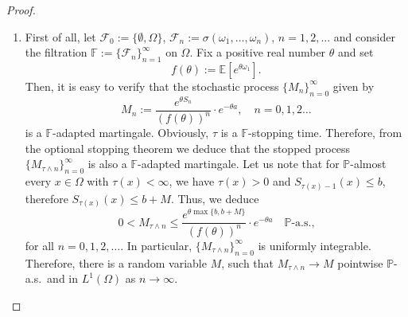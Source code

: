 \documentclass{amsart}
\newcommand{\cF}{\mathcal{F}}
\theoremstyle{definition}
\theoremstyle{remark}
\begin{document}
\begin{proof}
\begin{enumerate}
    \item First of all, let $\cF_0:=\{\emptyset,\Omega\}$, $\cF_n:=\sigma(\omega_1,\ldots,\omega_n)$, $n=1,2,\ldots$ and consider the filtration $\mathbb{F}:=\{\mathcal{F}_n\}^{\infty}_{n=1}$ on $\Omega$. Fix a positive real number $\theta$ and set
	\begin{equation*}
		f(\theta):=\mathbb{E}[e^{\theta\omega_1}].
	\end{equation*}
	Then, it is easy to verify that the stochastic process $\{M_n\}^{\infty}_{n=0}$ given by
	\begin{equation*}
		M_n:=\frac{e^{\theta S_n}}{(f(\theta))^n}\cdot e^{-\theta a},\quad n=0,1,2\ldots
	\end{equation*}
	is a $\mathbb{F}$-adapted martingale. Obviously, $\tau$ is a $\mathbb{F}$-stopping time. Therefore, from the optional stopping theorem we deduce that the stopped process $\{M_{\tau\wedge n}\}^{\infty}_{n=0}$ is also a $\mathbb{F}$-adapted martingale. Let us note that for $\mathbb{P}$-almost every $x\in\Omega$ with $\tau(x)<\infty$, we have $\tau(x)>0$ and $S_{\tau(x)-1}(x)\leq b$, therefore $S_{\tau(x)}(x)\leq b+M$. Thus, we deduce
	\begin{equation*}
		0<M_{\tau\wedge n}\leq\frac{e^{\theta\max\{b,b+M\}}}{(f(\theta))^n}\cdot e^{-\theta a}\quad\mathbb{P}\text{-a.s.,}
	\end{equation*}
    for all $n=0,1,2,\ldots$. In particular, $\{M_{\tau\wedge n}\}^{\infty}_{n=0}$ is uniformly integrable. Therefore, there is a random variable $M$, such that $M_{\tau\wedge n}\rightarrow M$ pointwise $\mathbb{P}$-a.s.~and in $L^1(\Omega)$ as $n\rightarrow\infty$. 
	

\end{enumerate}
\end{proof}
\end{document}
